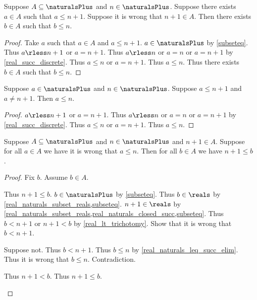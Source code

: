\begin{lemma}\label{real_naturals_split_succ}
    Suppose $A\subseteq\naturalsPlus$ and $n\in\naturalsPlus$.
    Suppose there exists $a\in A$ such that $a \leq n + 1$.
    Suppose it is wrong that $n + 1\in A$.
    Then there exists $b\in A$ such that $b \leq n$.
\end{lemma}
\begin{proof}
    Take $a$ such that $a\in A$ and $a \leq n + 1$.
    $a\in\naturalsPlus$ by \cref{subseteq}.
    Thus $a \rless n + 1$ or $a = n + 1$.
    Thus $a \rless n$ or $a = n$ or $a = n + 1$ by \cref{real_succ_discrete}.
    Thus $a \leq n$ or $a = n + 1$.
    Thus $a \leq n$.
    Thus there exists $b\in A$ such that $b \leq n$.
\end{proof}

\begin{lemma}\label{real_naturals_leq_succ_elim}
    Suppose $a\in\naturalsPlus$ and $n\in\naturalsPlus$.
    Suppose $a \leq n + 1$ and $a \neq n + 1$.
    Then $a \leq n$.
\end{lemma}
\begin{proof}
    $a \rless n + 1$ or $a = n + 1$.
    Thus $a \rless n$ or $a = n$ or $a = n + 1$ by \cref{real_succ_discrete}.
    Thus $a \leq n$ or $a = n + 1$.
    Thus $a \leq n$.
\end{proof}

\begin{lemma}\label{real_naturals_minimum_at_succ}
    Suppose $A\subseteq\naturalsPlus$ and $n\in\naturalsPlus$ and $n + 1\in A$.
    Suppose for all $a\in A$ we have it is wrong that $a \leq n$.
    Then for all $b\in A$ we have $n + 1 \leq b$.
\end{lemma}
\begin{proof}
    Fix $b$.
    Assume $b\in A$.
    \begin{byCase}
        Thus $n + 1 \leq b$.
        $b\in\naturalsPlus$ by \cref{subseteq}.
        Thus $b\in\reals$ by \cref{real_naturals_subset_reals,subseteq}.
        $n + 1\in\reals$ by \cref{real_naturals_subset_reals,real_naturals_closed_succ,subseteq}.
        Thus $b < n + 1$ or $n + 1 < b$ by \cref{real_lt_trichotomy}.
        Show that it is wrong that $b < n + 1$.
        \begin{subproof}
            Suppose not.
            Thus $b < n + 1$.
            Thus $b \leq n$ by \cref{real_naturals_leq_succ_elim}.
            Thus it is wrong that $b \leq n$.
            Contradiction.
        \end{subproof}
        Thus $n + 1 < b$.
        Thus $n + 1 \leq b$.
    \end{byCase}
\end{proof}

